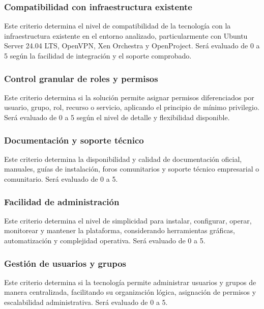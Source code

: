 \subsubsection{Compatibilidad con infraestructura existente}

Este criterio determina el nivel de compatibilidad de la tecnología con la infraestructura existente en el entorno analizado, particularmente con Ubuntu Server 24.04 \acs{LTS}, OpenVPN, Xen Orchestra y OpenProject. Será evaluado de 0 a 5 según la facilidad de integración y el soporte comprobado.

\subsubsection{Control granular de roles y permisos}

Este criterio determina si la solución permite asignar permisos diferenciados por usuario, grupo, rol, recurso o servicio, aplicando el principio de mínimo privilegio. Será evaluado de 0 a 5 según el nivel de detalle y flexibilidad disponible.

\subsubsection{Documentación y soporte técnico}

Este criterio determina la disponibilidad y calidad de documentación oficial, manuales, guías de instalación, foros comunitarios y soporte técnico empresarial o comunitario. Será evaluado de 0 a 5.

\subsubsection{Facilidad de administración}

Este criterio determina el nivel de simplicidad para instalar, configurar, operar, monitorear y mantener la plataforma, considerando herramientas gráficas, automatización y complejidad operativa. Será evaluado de 0 a 5.

\subsubsection{Gestión de usuarios y grupos}

Este criterio determina si la tecnología permite administrar usuarios y grupos de manera centralizada, facilitando su organización lógica, asignación de permisos y escalabilidad administrativa. Será evaluado de 0 a 5.

